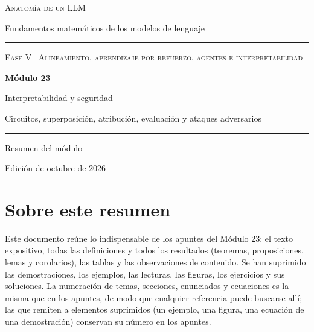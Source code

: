 \documentclass[11pt,a4paper,twoside,openany]{book}
\begin{document}
\frontmatter
\begin{titlepage}
\centering
\vspace*{2.5cm}
{\large\scshape Anatomía de un LLM}\par
\vspace{0.4cm}
{\normalsize Fundamentos matemáticos de los modelos de lenguaje}\par
\vspace{2.2cm}
\rule{\textwidth}{0.8pt}\par\vspace{0.5cm}
{\small\scshape Fase V \textperiodcentered\ Alineamiento, aprendizaje por refuerzo, agentes e interpretabilidad}\par\vspace{0.3cm}
{\Huge\bfseries Módulo 23\par}\vspace{0.3cm}
{\LARGE Interpretabilidad y seguridad\par}
\vspace{0.2cm}
{\large Circuitos, superposición, atribución, evaluación y ataques adversarios\par}
\vspace{0.5cm}\rule{\textwidth}{0.4pt}\par
\vspace{1.6cm}
{\large Resumen del módulo}\par
\vfill
{\small Edición de octubre de 2026}\par
\end{titlepage}

\chapter*{Sobre este resumen}

Este documento reúne lo indispensable de los apuntes del Módulo 23: el texto expositivo, todas las definiciones y todos los resultados (teoremas, proposiciones, lemas y corolarios), las tablas y las observaciones de contenido. Se han suprimido las demostraciones, los ejemplos, las lecturas, las figuras, los ejercicios y sus soluciones. La numeración de temas, secciones, enunciados y ecuaciones es la misma que en los apuntes, de modo que cualquier referencia puede buscarse allí; las que remiten a elementos suprimidos (un ejemplo, una figura, una ecuación de una demostración) conservan su número en los apuntes.
\end{document}
